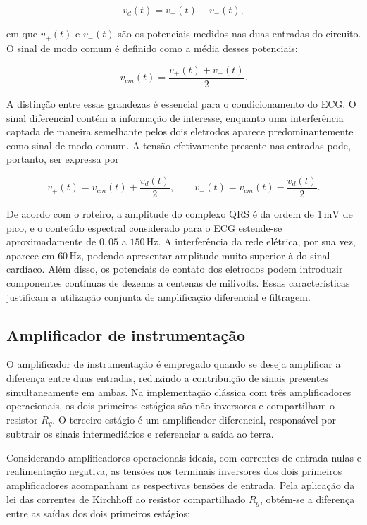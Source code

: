 \documentclass[11pt,a4paper]{article}
\begin{document}
\begin{equation}
v_d(t)=v_+(t)-v_-(t),
\label{eq:sinal_diferencial}
\end{equation}

em que $v_+(t)$ e $v_-(t)$ são os potenciais medidos nas duas entradas do circuito. O sinal de modo comum é definido como a média desses potenciais:

\begin{equation}
v_{cm}(t)=\frac{v_+(t)+v_-(t)}{2}.
\label{eq:sinal_modo_comum}
\end{equation}

A distinção entre essas grandezas é essencial para o condicionamento do ECG. O sinal diferencial contém a informação de interesse, enquanto uma interferência captada de maneira semelhante pelos dois eletrodos aparece predominantemente como sinal de modo comum. A tensão efetivamente presente nas entradas pode, portanto, ser expressa por

\begin{equation}
v_+(t)=v_{cm}(t)+\frac{v_d(t)}{2},
\qquad
v_-(t)=v_{cm}(t)-\frac{v_d(t)}{2}.
\label{eq:decomposicao_entradas}
\end{equation}

De acordo com o roteiro, a amplitude do complexo QRS é da ordem de $1\,\mathrm{mV}$ de pico, e o conteúdo espectral considerado para o ECG estende-se aproximadamente de $0{,}05$ a $150\,\mathrm{Hz}$. A interferência da rede elétrica, por sua vez, aparece em $60\,\mathrm{Hz}$, podendo apresentar amplitude muito superior à do sinal cardíaco. Além disso, os potenciais de contato dos eletrodos podem introduzir componentes contínuas de dezenas a centenas de milivolts. Essas características justificam a utilização conjunta de amplificação diferencial e filtragem.

\subsection{Amplificador de instrumentação}

O amplificador de instrumentação é empregado quando se deseja amplificar a diferença entre duas entradas, reduzindo a contribuição de sinais presentes simultaneamente em ambas. Na implementação clássica com três amplificadores operacionais, os dois primeiros estágios são não inversores e compartilham o resistor $R_g$. O terceiro estágio é um amplificador diferencial, responsável por subtrair os sinais intermediários e referenciar a saída ao terra.

Considerando amplificadores operacionais ideais, com correntes de entrada nulas e realimentação negativa, as tensões nos terminais inversores dos dois primeiros amplificadores acompanham as respectivas tensões de entrada. Pela aplicação da lei das correntes de Kirchhoff ao resistor compartilhado $R_g$, obtém-se a diferença entre as saídas dos dois primeiros estágios:
\end{document}
